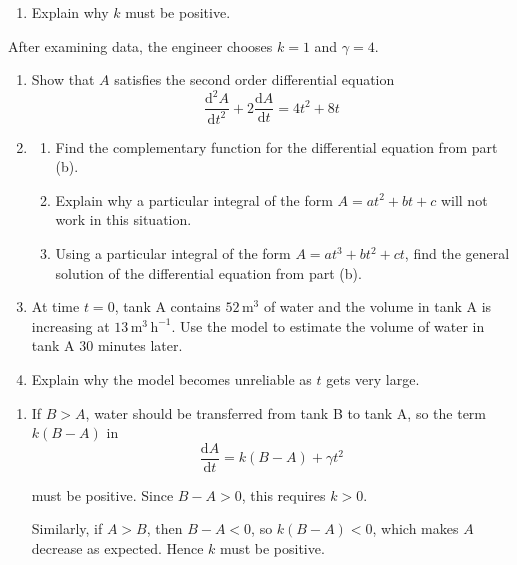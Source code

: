 \documentclass[leqno]{article}
\begin{document}
\begin{enumerate}[
  label=\textbf{\arabic*.},
  leftmargin=*,
  topsep=0pt,
  partopsep=0pt,
  parsep=0pt
]
\begin{enumerate}[label=\textbf{(\alph*)}]
  \item Explain why $k$ must be positive.  \\
\end{enumerate}
After examining data, the engineer chooses $k=1$ and $\gamma=4$. \\
\begin{enumerate}[label=\textbf{(\alph*)}, resume]
  \item Show that $A$ satisfies the second order differential equation
  \[
  \frac{\mathrm{d}^2 A}{\mathrm{d}t^2}+2\frac{\mathrm{d}A}{\mathrm{d}t}=4t^2+8t
  \]
  \item
  \begin{enumerate}[label=(\roman*)]
    \item Find the complementary function for the differential equation from part (b). 
    \item Explain why a particular integral of the form $A=at^2+bt+c$ will not work in this situation. 
    \item Using a particular integral of the form $A=at^3+bt^2+ct$, find the general solution of the differential equation from part (b).  \\
  \end{enumerate}
  \item At time $t=0$, tank A contains $52\,\mathrm{m^3}$ of water and the volume in tank A is increasing at $13\,\mathrm{m^3\,h^{-1}}$. Use the model to estimate the volume of water in tank A $30$ minutes later.  \\
  \item Explain why the model becomes unreliable as $t$ gets very large.  \\
\end{enumerate}

\vspace*{10pt}

\begin{djsSolution}
\begin{enumerate}[label=\textbf{(\alph*)}]
  \item If \(B>A\), water should be transferred from tank B to tank A, so the term \(k(B-A)\) in
  \[
  \frac{\mathrm{d}A}{\mathrm{d}t}=k(B-A)+\gamma t^2
  \]

  must be positive. Since \(B-A>0\), this requires \(k>0\).

  Similarly, if \(A>B\), then \(B-A<0\), so \(k(B-A)<0\), which makes \(A\) decrease as expected. Hence \(k\) must be positive.


\end{enumerate}
\end{djsSolution}
\end{enumerate}
\end{document}
